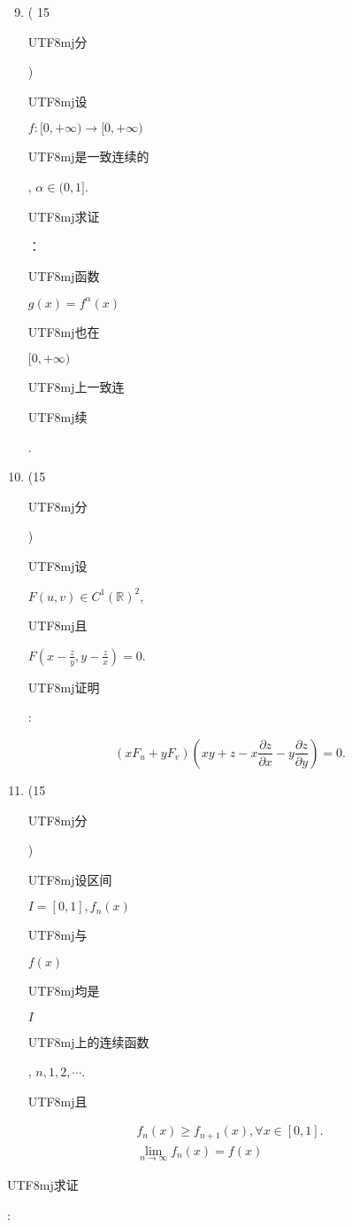 \documentclass[10pt]{article}
\begin{document}
\begin{enumerate}
  \setcounter{enumi}{8}
  \item ( 15 \begin{CJK}{UTF8}{mj}分\end{CJK}) \begin{CJK}{UTF8}{mj}设\end{CJK} $f:[0,+\infty) \rightarrow[0,+\infty)$ \begin{CJK}{UTF8}{mj}是一致连续的\end{CJK}, $\alpha \in(0,1]$. \begin{CJK}{UTF8}{mj}求证\end{CJK}：\begin{CJK}{UTF8}{mj}函数\end{CJK} $g(x)=f^{\alpha}(x)$ \begin{CJK}{UTF8}{mj}也在\end{CJK} $[0,+\infty)$ \begin{CJK}{UTF8}{mj}上一致连\end{CJK} \begin{CJK}{UTF8}{mj}续\end{CJK}.

  \item (15 \begin{CJK}{UTF8}{mj}分\end{CJK}) \begin{CJK}{UTF8}{mj}设\end{CJK} $F(u, v) \in C^{1}(\mathbb{R})^{2}$, \begin{CJK}{UTF8}{mj}且\end{CJK} $F\left(x-\frac{z}{y}, y-\frac{z}{x}\right)=0$. \begin{CJK}{UTF8}{mj}证明\end{CJK}:

\end{enumerate}
$$
\left(x F_{u}+y F_{v}\right)\left(x y+z-x \frac{\partial z}{\partial x}-y \frac{\partial z}{\partial y}\right)=0 .
$$

\begin{enumerate}
  \setcounter{enumi}{10}
  \item (15 \begin{CJK}{UTF8}{mj}分\end{CJK}) \begin{CJK}{UTF8}{mj}设区间\end{CJK} $I=[0,1], f_{n}(x)$ \begin{CJK}{UTF8}{mj}与\end{CJK} $f(x)$ \begin{CJK}{UTF8}{mj}均是\end{CJK} $I$ \begin{CJK}{UTF8}{mj}上的连续函数\end{CJK}, $n, 1,2, \cdots$. \begin{CJK}{UTF8}{mj}且\end{CJK}
\end{enumerate}
$$
\begin{gathered}
f_{n}(x) \geqslant f_{n+1}(x), \forall x \in[0,1] . \\
\lim _{n \rightarrow \infty} f_{n}(x)=f(x)
\end{gathered}
$$
\begin{CJK}{UTF8}{mj}求证\end{CJK}:
\end{document}

